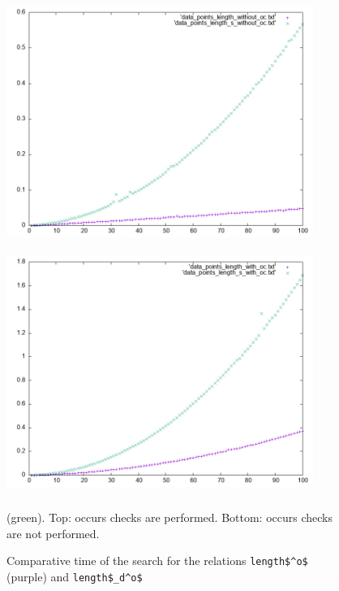 \begin{figure}[t]
    \includegraphics[width=10cm,height=8cm]{lengths_without_oc.png}
    \includegraphics[width=10cm,height=8cm]{lengths_with_oc.png}
  \caption{Comparative time of the search for the relations \lstinline|length$^o$| (purple) and \lstinline|length$_d^o$|} (green).
  Top: occurs checks are performed.
  Bottom: occurs checks are not performed.
  \label{fig:length_plots}
\end{figure}


